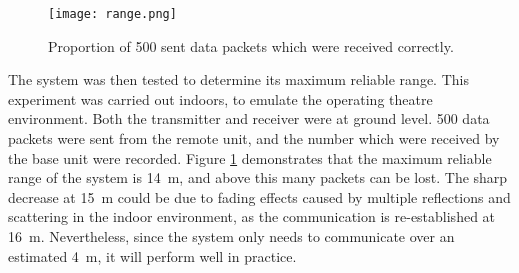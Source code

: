 \begin{figure}[htb]
	\centering
	\texttt{[image: range.png]}
	\caption{Proportion of 500 sent data packets which were received correctly.}
	\label{fig: range}
\end{figure}

The system was then tested to determine its maximum reliable range. This experiment was carried out indoors, to emulate the operating theatre environment. Both the transmitter and receiver were at ground level. 500 data packets were sent from the remote unit, and the number which were received by the base unit were recorded. Figure \ref{fig: range} demonstrates that the maximum reliable range of the system is \SI{14}{\metre}, and above this many packets can be lost. The sharp decrease at \SI{15}{\metre} could be due to fading effects caused by multiple reflections and scattering in the indoor environment, as the communication is re-established at \SI{16}{\metre}. Nevertheless, since the system only needs to communicate over an estimated \SI{4}{\metre}, it will perform well in practice.\\








